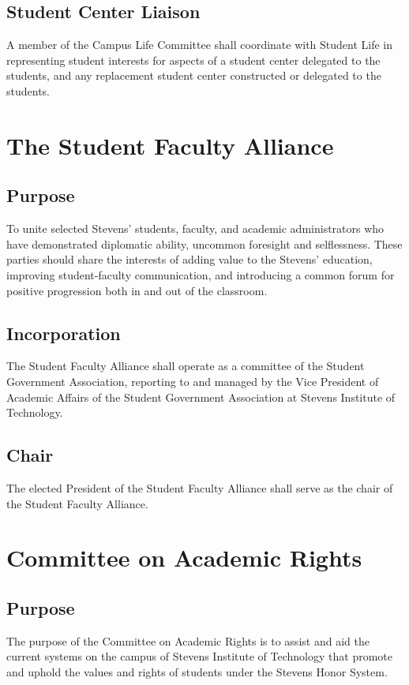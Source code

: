\documentclass[12pt]{scrreprt}
\begin{document}
\subsection{Student Center Liaison}
A member of the Campus Life Committee shall coordinate with Student Life in 
representing student interests for aspects of a student center delegated to 
the students, and any replacement student center constructed or delegated to 
the students.

\section{The Student Faculty Alliance}

\subsection{Purpose}
To unite selected Stevens’ students, faculty, and academic administrators who have
demonstrated diplomatic ability, uncommon foresight and selflessness. These parties
should share the interests of adding value to the Stevens’ education, improving student-faculty
communication, and introducing a common forum for positive progression both
in and out of the classroom.

\subsection{Incorporation}
The Student Faculty Alliance shall operate as a committee of the Student Government
Association, reporting to and managed by the Vice President of Academic Affairs of the
Student Government Association at Stevens Institute of Technology.

\subsection{Chair}
The elected President of the Student Faculty Alliance shall serve as the chair of the Student Faculty Alliance.

\section{Committee on Academic Rights}

\subsection{Purpose}
The purpose of the Committee on Academic Rights is to assist and aid the current
systems on the campus of Stevens Institute of Technology that promote and uphold the
values and rights of students under the Stevens Honor System.
\end{document}
